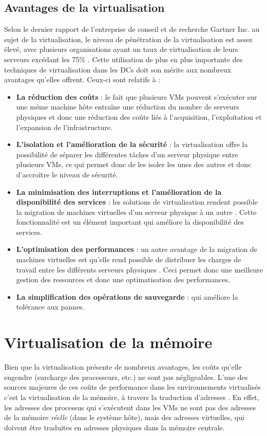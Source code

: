 \subsection{Avantages de la virtualisation}
Selon le dernier rapport de l’entreprise de conseil et de recherche Gartner Inc. au sujet de la virtualisation, le niveau de pénétration de la virtualisation est assez élevé, avec plusieurs organisations ayant un taux de virtualisation de leurs serveurs excédant les 75\% \cite{online3}. Cette utilisation de plus en plus importante des techniques de virtualisation dans les DCs doit son mérite aux nombreux avantages qu'elles offrent. Ceux-ci sont relatifs à :

\begin{itemize}[label=, font=\large \color{darkorange}]
    \item \textbf{La réduction des coûts} : le fait que plusieurs VMs pouvent s'exécuter sur une même machine hôte entraîne une réduction du nombre de serveurs physiques et donc une réduction des coûts liés à l'acquisition, l'exploitation et l'expansion de l'infrastructure. 
    \item \textbf{L'isolation et l'amélioration de la sécurité} : la virtualisation offre la possibilité de séparer les différentes tâches d'un serveur physique entre plusieurs VMs, ce qui permet donc de les isoler les unes des autres et donc d'accroître le niveau de sécurité.
    \item \textbf{La minimisation des interruptions et l'amélioration de la disponibilité des services} : les solutions de virtualisation rendent possible la migration de machines virtuelles d'un serveur physique à un autre \cite{article3, article4}. Cette fonctionnalité est un élément important qui améliore la disponibilité des services.
    \item \textbf{L'optimisation des performances} : un autre avantage de la migration de machines virtuelles est qu'elle rend possible de distribuer les charges de travail entre les différents serveurs physiques \cite{article3, article4}. Ceci permet donc une meilleure gestion des ressources et donc une optimatisation des performances.
    \item \textbf{La simplification des opérations de sauvegarde} : qui améliore la tolérance aux pannes.
\end{itemize}

\section{Virtualisation de la mémoire}
Bien que la virtualisation présente de nombreux avantages, les coûts qu'elle engendre (surcharge des processeurs, etc.) ne sont pas négligeables. L'une des sources majeures de ces coûts de performance dans les environnements virtualisés c'est la virtualisation de la mémoire, à travers la traduction d'adresses \cite{article6, article8}. En effet, les adresses des processus qui s'exécutent dans les VMs ne sont pas des adresses de la mémoire \textit{réelle} (dans le système hôte), mais des adresses virtuelles, qui doivent être traduites en adresses physiques dans la mémoire centrale. 


